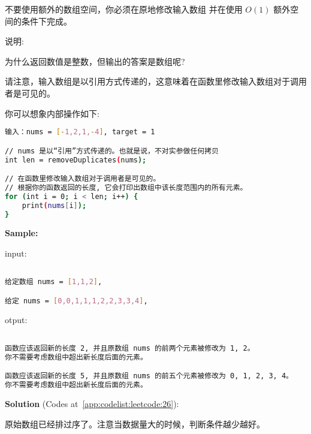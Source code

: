 不要使用额外的数组空间，你必须在原地修改输入数组 并在使用 $ O(1) $ 额外空间的条件下完成。\par

说明:\par

为什么返回数值是整数，但输出的答案是数组呢?\par

请注意，输入数组是以引用方式传递的，这意味着在函数里修改输入数组对于调用者是可见的。\par

你可以想象内部操作如下:\par

\begin{lstlisting}[language=bash]
输入：nums = [-1,2,1,-4], target = 1

// nums 是以“引用”方式传递的。也就是说，不对实参做任何拷贝
int len = removeDuplicates(nums);

// 在函数里修改输入数组对于调用者是可见的。
// 根据你的函数返回的长度, 它会打印出数组中该长度范围内的所有元素。
for (int i = 0; i < len; i++) {
    print(nums[i]);
}
\end{lstlisting}


\textbf{Sample:}\par

input:\par

\begin{lstlisting}[language=bash]

给定数组 nums = [1,1,2], 

给定 nums = [0,0,1,1,1,2,2,3,3,4],


\end{lstlisting}

otput:\par

\begin{lstlisting}[language=bash]

函数应该返回新的长度 2, 并且原数组 nums 的前两个元素被修改为 1, 2。 
你不需要考虑数组中超出新长度后面的元素。

函数应该返回新的长度 5, 并且原数组 nums 的前五个元素被修改为 0, 1, 2, 3, 4。
你不需要考虑数组中超出新长度后面的元素。


\end{lstlisting}

\textbf{Solution }(Codes at~\ref{app:codelist:leetcode:26}):\par

原始数组已经排过序了。注意当数据量大的时候，判断条件越少越好。\par



